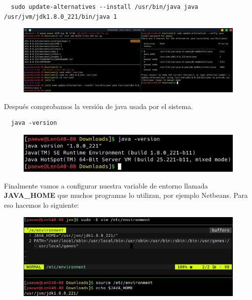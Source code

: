 \documentclass{article}
\begin{document}
\begin{verbatim}
  sudo update-alternatives --install /usr/bin/java java /usr/jvm/jdk1.8.0_221/bin/java 1
\end{verbatim}


\begin{figure}[h!]
    \centering
      \includegraphics[scale=0.5]{./Pictures/005_oraclejavaselect.png}
\end{figure}


Después comprobamos la versión de java usada por el sistema.\\

\begin{verbatim}
  java -version
\end{verbatim}

\begin{figure}[h!]
    \centering
      \includegraphics[scale=0.75]{./Pictures/006_javaversion2.png}
\end{figure}

\newpage

Finalmente vamos a configurar nuestra variable de entorno llamada
\textbf{JAVA\_HOME} que muchos programas lo utilizan, por ejemplo Netbeans.
Para eso hacemos lo siguiente:\\

\begin{figure}[h!]
    \centering
      \includegraphics[scale=0.75]{./Pictures/007_java_home.png}
\end{figure}
\end{document}
